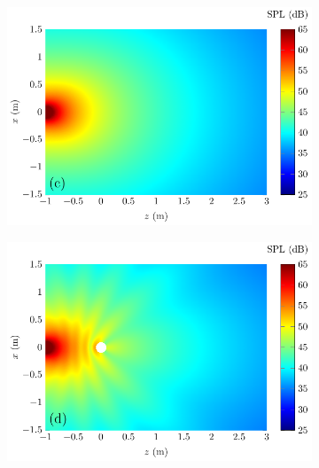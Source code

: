 \begin{figure}[!htb]
    \\
    \begin{subfigure}{0.49\textwidth}
        \centering
        \includegraphics[width = \textwidth]{fig/CircPiston_NoSphere_2D_1000Hz_210718D_211211L}
    \end{subfigure}
    \begin{subfigure}{0.49\textwidth}
        \centering
        \includegraphics[width = \textwidth]{fig/CircPiston_Sphere_2D_1000Hz_210718D_211211M}
    \end{subfigure}
    \\
    \begin{subfigure}{0.49\textwidth}
        \centering

\end{subfigure}
\end{figure}
